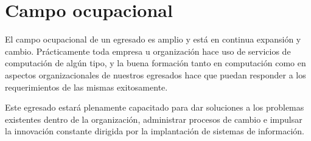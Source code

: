 \section{Campo ocupacional}\label{sec:campo-ocupacional}

El campo ocupacional de un egresado es amplio y está en continua expansión y cambio. Prácticamente toda empresa
u organización hace uso de servicios de computación de algún tipo, y la buena formación tanto en computación como en aspectos organizacionales de nuestros egresados hace que puedan responder a los requerimientos de las mismas exitosamente. 

Este egresado estará plenamente capacitado para dar soluciones a los problemas existentes dentro de la organización, administrar procesos de cambio  e impulsar la innovación  constante dirigida por la implantación de sistemas de información.
